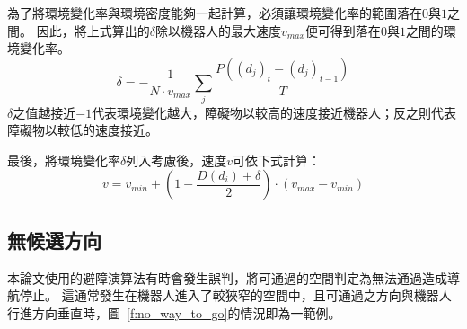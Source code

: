 為了將環境變化率與環境密度能夠一起計算，必須讓環境變化率的範圍落在$0$與$1$之間。
因此，將上式算出的$\delta$除以機器人的最大速度$v_{max}$便可得到落在$0$與$1$之間的環境變化率。
\begin{equation}
	\delta = -\frac{1}{N \cdot v_{max}}\sum_{j}\frac{P((d_j)_t - (d_j)_{t-1})}{T}
\end{equation}
$\delta$之值越接近$-1$代表環境變化越大，障礙物以較高的速度接近機器人；反之則代表障礙物以較低的速度接近。

最後，將環境變化率$\delta$列入考慮後，速度$v$可依下式計算：
\begin{equation}
	v = v_{min} + (1-\frac{D(d_i)+\delta}{2}) \cdot (v_{max} - v_{min})
\end{equation}

\subsection{無候選方向}
本論文使用的避障演算法有時會發生誤判，將可通過的空間判定為無法通過造成導航停止。
這通常發生在機器人進入了較狹窄的空間中，且可通過之方向與機器人行進方向垂直時，圖~\ref{f:no_way_to_go}的情況即為一範例。
